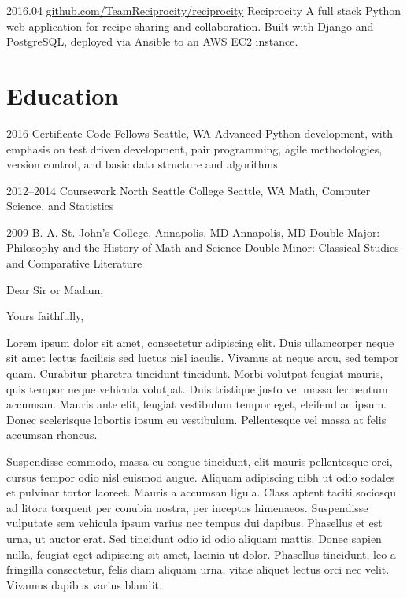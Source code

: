 \documentclass[10pt,a4paper,sans]{moderncv}        %
\begin{document}
\cventry
{2016.04}
{\href{http://github.com/TeamReciprocity/reciprocity}{github.com/TeamReciprocity/reciprocity}}
{Reciprocity}
{}
{}
{A full stack Python web application for recipe sharing and collaboration. Built
with Django and PostgreSQL, deployed via Ansible to an AWS EC2 instance.}
  
\section{Education}
\cventry
{2016}
{Certificate}
{Code Fellows}
{Seattle, WA}
{}
{Advanced Python development, with emphasis on test driven development, pair
  programming, agile methodologies, version control, and basic data structure
  and algorithms}

\cventry
{2012--2014}
{Coursework}
{North Seattle College}
{Seattle, WA}
{}
{Math, Computer Science, and Statistics}

\cventry
{2009}
{B. A.}
{St. John's College, Annapolis, MD}
{Annapolis, MD}
{}
{Double Major: Philosophy and the History of Math and Science\newline{}
Double Minor: Classical Studies and Comparative Literature}

\clearpage
\date{January 01, 1984}
\opening{Dear Sir or Madam,}
\closing{Yours faithfully,}
\makelettertitle

Lorem ipsum dolor sit amet, consectetur adipiscing elit. Duis ullamcorper neque sit amet lectus facilisis sed luctus nisl iaculis. Vivamus at neque arcu, sed tempor quam. Curabitur pharetra tincidunt tincidunt. Morbi volutpat feugiat mauris, quis tempor neque vehicula volutpat. Duis tristique justo vel massa fermentum accumsan. Mauris ante elit, feugiat vestibulum tempor eget, eleifend ac ipsum. Donec scelerisque lobortis ipsum eu vestibulum. Pellentesque vel massa at felis accumsan rhoncus.

Suspendisse commodo, massa eu congue tincidunt, elit mauris pellentesque orci, cursus tempor odio nisl euismod augue. Aliquam adipiscing nibh ut odio sodales et pulvinar tortor laoreet. Mauris a accumsan ligula. Class aptent taciti sociosqu ad litora torquent per conubia nostra, per inceptos himenaeos. Suspendisse vulputate sem vehicula ipsum varius nec tempus dui dapibus. Phasellus et est urna, ut auctor erat. Sed tincidunt odio id odio aliquam mattis. Donec sapien nulla, feugiat eget adipiscing sit amet, lacinia ut dolor. Phasellus tincidunt, leo a fringilla consectetur, felis diam aliquam urna, vitae aliquet lectus orci nec velit. Vivamus dapibus varius blandit.
\end{document}
